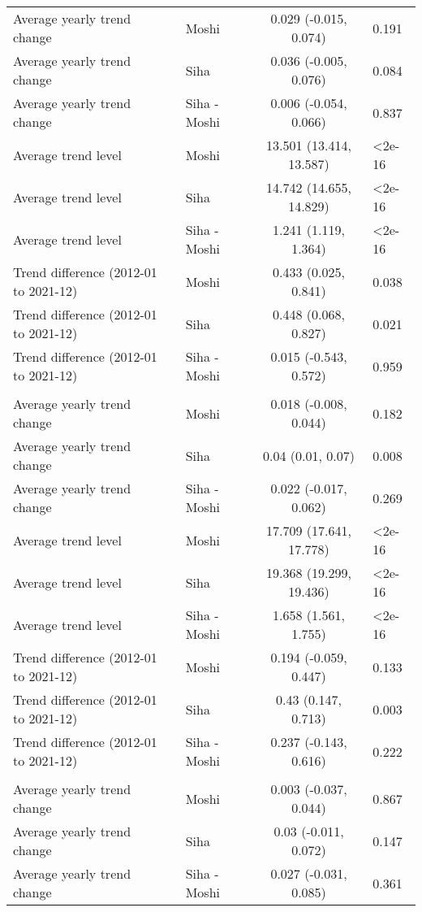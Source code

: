 \begin{longtable}{l|lcl}
\midrule\addlinespace[2.5pt]
Average yearly trend change & Moshi & 0.029 (-0.015, 0.074) & 0.191 \\ 
Average yearly trend change & Siha & 0.036 (-0.005, 0.076) & 0.084 \\ 
Average yearly trend change & Siha - Moshi & 0.006 (-0.054, 0.066) & 0.837 \\ 
Average trend level & Moshi & 13.501 (13.414, 13.587) & <2e-16 \\ 
Average trend level & Siha & 14.742 (14.655, 14.829) & <2e-16 \\ 
Average trend level & Siha - Moshi & 1.241 (1.119, 1.364) & <2e-16 \\ 
Trend difference (2012-01 to 2021-12) & Moshi & 0.433 (0.025, 0.841) & 0.038 \\ 
Trend difference (2012-01 to 2021-12) & Siha & 0.448 (0.068, 0.827) & 0.021 \\ 
Trend difference (2012-01 to 2021-12) & Siha - Moshi & 0.015 (-0.543, 0.572) & 0.959 \\ 
\midrule\addlinespace[2.5pt]
\multicolumn{4}{l}{Mean temperature} \\ 
\midrule\addlinespace[2.5pt]
Average yearly trend change & Moshi & 0.018 (-0.008, 0.044) & 0.182 \\ 
Average yearly trend change & Siha & 0.04 (0.01, 0.07) & 0.008 \\ 
Average yearly trend change & Siha - Moshi & 0.022 (-0.017, 0.062) & 0.269 \\ 
Average trend level & Moshi & 17.709 (17.641, 17.778) & <2e-16 \\ 
Average trend level & Siha & 19.368 (19.299, 19.436) & <2e-16 \\ 
Average trend level & Siha - Moshi & 1.658 (1.561, 1.755) & <2e-16 \\ 
Trend difference (2012-01 to 2021-12) & Moshi & 0.194 (-0.059, 0.447) & 0.133 \\ 
Trend difference (2012-01 to 2021-12) & Siha & 0.43 (0.147, 0.713) & 0.003 \\ 
Trend difference (2012-01 to 2021-12) & Siha - Moshi & 0.237 (-0.143, 0.616) & 0.222 \\ 
\midrule\addlinespace[2.5pt]
\multicolumn{4}{l}{Max. temperature} \\ 
\midrule\addlinespace[2.5pt]
Average yearly trend change & Moshi & 0.003 (-0.037, 0.044) & 0.867 \\ 
Average yearly trend change & Siha & 0.03 (-0.011, 0.072) & 0.147 \\ 
Average yearly trend change & Siha - Moshi & 0.027 (-0.031, 0.085) & 0.361 \\ 

\end{longtable}
